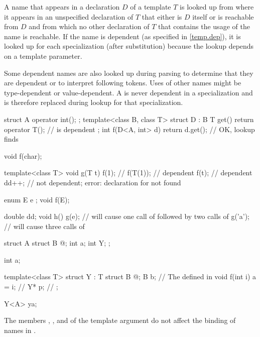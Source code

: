 \pnum
A name that appears in a declaration $D$ of a template $T$ is looked up
from where it appears
in an unspecified declaration of $T$
that either is $D$ itself or is reachable from $D$ and
from which no other declaration of $T$
that contains the usage of the name is reachable.
If the name is dependent (as specified in \ref{temp.dep}),
it is looked up for each specialization (after substitution)
because the lookup depends on a template parameter.
\begin{note}
Some dependent names are also looked up during parsing to determine
that they are dependent or to interpret following \tcode{<} tokens.
Uses of other names might be type-dependent or
value-dependent.
A  is never dependent in a specialization and
is therefore replaced during lookup for that specialization.
\end{note}
\begin{example}
\begin{codeblock}
struct A { operator int(); };
template<class B, class T>
struct D : B {
  T get() { return operator T(); }      //  is dependent
};
int f(D<A, int> d) { return d.get(); }  // OK, lookup finds 
\end{codeblock}
\end{example}
\begin{example}
\begin{codeblock}
void f(char);

template<class T> void g(T t) {
  f(1);             // 
  f(T(1));          // dependent
  f(t);             // dependent
  dd++;             // not dependent; error: declaration for  not found
}

enum E { e };
void f(E);

double dd;
void h() {
  g(e);             // will cause one call of  followed by two calls of 
  g('a');           // will cause three calls of 
}
\end{codeblock}
\end{example}
\begin{example}
\begin{codeblock}
struct A {
  struct B { @\commentellip@ };
  int a;
  int Y;
};

int a;

template<class T> struct Y : T {
  struct B { @\commentellip@ };
  B b;                          // The  defined in 
  void f(int i) { a = i; }      // 
  Y* p;                         // 
};

Y<A> ya;
\end{codeblock}

The members , , and 
of the template argument 
do not affect the binding of names in .
\end{example}

